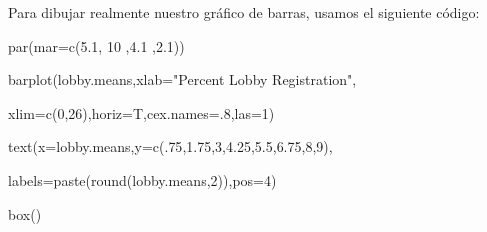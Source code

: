 \documentclass[
]{book}
\newenvironment{Shaded}{\begin{snugshade}}{\end{snugshade}}
\newcommand{\AttributeTok}[1]{\textcolor[rgb]{0.77,0.63,0.00}{#1}}
\newcommand{\DecValTok}[1]{\textcolor[rgb]{0.00,0.00,0.81}{#1}}
\newcommand{\FloatTok}[1]{\textcolor[rgb]{0.00,0.00,0.81}{#1}}
\newcommand{\FunctionTok}[1]{\textcolor[rgb]{0.00,0.00,0.00}{#1}}
\newcommand{\NormalTok}[1]{#1}
\newcommand{\StringTok}[1]{\textcolor[rgb]{0.31,0.60,0.02}{#1}}
\begin{document}
Para dibujar realmente nuestro gráfico de barras, usamos el siguiente código:

\begin{Shaded}
\begin{Highlighting}[]
\FunctionTok{par}\NormalTok{(}\AttributeTok{mar=}\FunctionTok{c}\NormalTok{(}\FloatTok{5.1}\NormalTok{, }\DecValTok{10}\NormalTok{ ,}\FloatTok{4.1}\NormalTok{ ,}\FloatTok{2.1}\NormalTok{))}

\FunctionTok{barplot}\NormalTok{(lobby.means,}\AttributeTok{xlab=}\StringTok{"Percent Lobby Registration"}\NormalTok{,}

     \AttributeTok{xlim=}\FunctionTok{c}\NormalTok{(}\DecValTok{0}\NormalTok{,}\DecValTok{26}\NormalTok{),}\AttributeTok{horiz=}\NormalTok{T,}\AttributeTok{cex.names=}\NormalTok{.}\DecValTok{8}\NormalTok{,}\AttributeTok{las=}\DecValTok{1}\NormalTok{)}

\FunctionTok{text}\NormalTok{(}\AttributeTok{x=}\NormalTok{lobby.means,}\AttributeTok{y=}\FunctionTok{c}\NormalTok{(.}\DecValTok{75}\NormalTok{,}\FloatTok{1.75}\NormalTok{,}\DecValTok{3}\NormalTok{,}\FloatTok{4.25}\NormalTok{,}\FloatTok{5.5}\NormalTok{,}\FloatTok{6.75}\NormalTok{,}\DecValTok{8}\NormalTok{,}\DecValTok{9}\NormalTok{),}

     \AttributeTok{labels=}\FunctionTok{paste}\NormalTok{(}\FunctionTok{round}\NormalTok{(lobby.means,}\DecValTok{2}\NormalTok{)),}\AttributeTok{pos=}\DecValTok{4}\NormalTok{)}

\FunctionTok{box}\NormalTok{()}
\end{Highlighting}
\end{Shaded}
\end{document}
